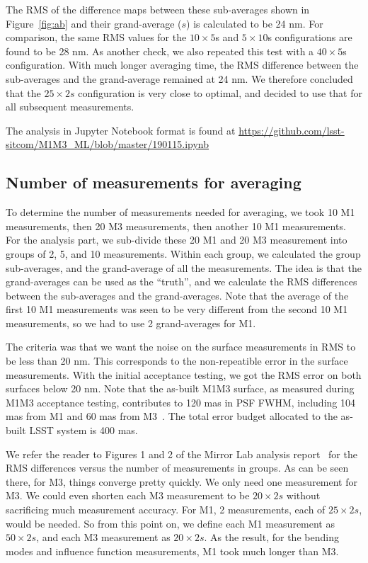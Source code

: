 \documentclass [twoside,openbib,12pt]{article}
\begin{document}
The RMS of the difference maps between these sub-averages shown in Figure~\ref{fig:ab} and their
grand-average ($s$) is calculated to be 24 nm.
For comparison, the same RMS values for the $10 \times 5$s and $5
\times 10$s configurations are found to be 28 nm.
As another check, we also repeated this test with a $40 \times 5$s
configuration. With much longer averaging time, the RMS difference
between the sub-averages and the grand-average remained at 24 nm.
We therefore concluded that the $25 \times 2s$ configuration is very
close to optimal, and decided to use that for all subsequent
measurements.

The analysis in Jupyter Notebook format is found at
\url{https://github.com/lsst-sitcom/M1M3_ML/blob/master/190115.ipynb}

\subsection{Number of measurements for averaging}

To determine the number of measurements needed for averaging, we took
10 M1 measurements, then 20 M3 measurements, then another 10 M1
measurements.
For the analysis part, we sub-divide these 20 M1 and 20 M3 measurement
into groups of 2, 5, and 10 measurements. Within each group, we
calculated the group sub-averages, and the grand-average of all the
measurements.
The idea is that the grand-averages can be used as the ``truth'', and
we calculate the RMS differences between the sub-averages and the grand-averages.
Note that the average of the first 10 M1 measurements
was seen to be very different from the second 10 M1 measurements, so
we had to use 2 grand-averages for M1.

The criteria was that we want the noise on the surface measurements in
RMS to be less than 20 nm. This corresponds to the non-repeatible
error in the surface measurements. With the initial acceptance
testing, we got the RMS error on both surfaces below 20 nm. Note that
the as-built M1M3 surface, as measured during M1M3 acceptance testing,
contributes to 120 mas in PSF FWHM, including 104 mas from M1 and 60
mas from M3~\cite{m1m3perf}. The total error budget allocated to the as-built LSST
system is 400 mas.

We refer the reader to Figures
1 and 2 of the Mirror Lab analysis report~\cite{m1m3UAreport}
for the RMS differences
versus the number of measurements in groups.
As can be seen there, for M3, things converge pretty quickly. We only
need one measurement for M3. We could even shorten each M3 measurement
to be $20 \times 2s$ without sacrificing much measurement accuracy.
For M1, 2 measurements, each of $25 \times 2s$, would be needed.
So from this point on, we define each M1 measurement as $50 \times
2s$, and each M3 measurement as $20 \times 2s$.
As the result, for the bending modes and influence function
measurements, M1 took much longer than M3.
\end{document}
